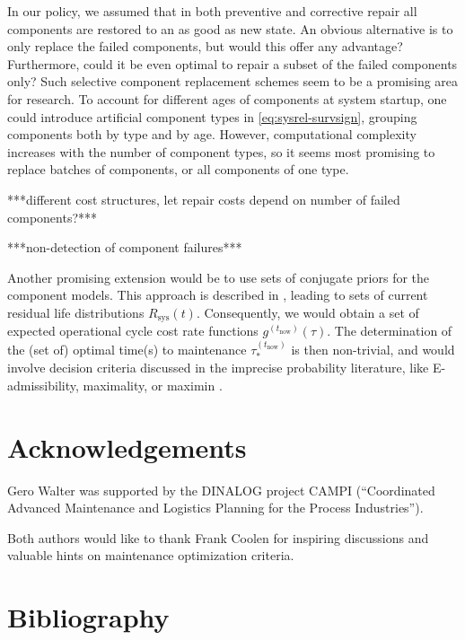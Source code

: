 \documentclass[authoryear]{elsarticle}
\renewcommand{\vec}[1]{{\bm#1}}
\newcommand{\uz}{^{(0)}} %
\newcommand{\Rsys}{R_\text{sys}}
\def\ykz{y\uz_k}
\def\nkz{n\uz_k}
\def\tnow{t_\text{now}}
\newcommand{\Rsysnow}{R^{(t_\text{now})}_\text{sys}}
\def\vectknow{\vec{t}_k^{(\tnow)}}
\newcommand{\gnow}{g^{(\tnow)}}
\newcommand{\tausnow}{\tau_*^{(\tnow)}}
\begin{document}
In our policy, we assumed that in both preventive and corrective repair
all components are restored to an as good as new state.
An obvious alternative is to only replace the failed components,
but would this offer any advantage?
Furthermore, could it be even optimal to repair a subset of the failed components only?
Such selective component replacement schemes
seem to be a promising area for research.
To account for different ages of components at system startup,
one could introduce artificial component types in \eqref{eq:sysrel-survsign},
grouping components both by type and by age.
However, computational complexity increases with the number of component types,
so it seems most promising to replace batches of components,
or all components of one type.

***different cost structures, let repair costs depend on number of failed components?***

***non-detection of component failures***

Another promising extension would be to use sets of conjugate priors for the component models.
This approach is described in \cite{2016:walter-coolen},
leading to sets of current residual life distributions $\Rsys(t)$.
Consequently, we would obtain a set of expected operational cycle cost rate functions $\gnow(\tau)$.
The determination of the (set of) optimal time(s) to maintenance $\tausnow$
is then non-trivial,
and would involve decision criteria discussed in the imprecise probability literature,
like E-admissibility, maximality, or maximin \citep[see, e.g., \S 8][]{itip}.


\section*{Acknowledgements}

Gero Walter was supported by the DINALOG project CAMPI
(``Coordinated Advanced Maintenance and Logistics Planning for the Process Industries'').

Both authors would like to thank Frank Coolen for inspiring discussions
and valuable hints on maintenance optimization criteria.

\section*{Bibliography}




\end{document}
